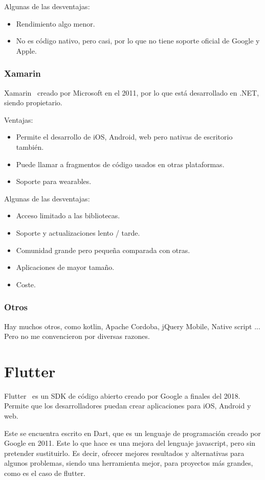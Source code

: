 Algunas de las desventajas:
\begin{itemize}
	\item Rendimiento algo menor.
	\item No es código nativo, pero casi, por lo que no tiene soporte oficial de Google y Apple.
\end{itemize}

\subsubsection{Xamarin}
Xamarin~\cite{wiki:xamarin} creado por Microsoft en el 2011, por lo que está desarrollado en .NET, siendo propietario.

Ventajas:
\begin{itemize}
	\item Permite el desarrollo de iOS, Android, web pero nativas de escritorio también.
	\item Puede llamar a fragmentos de código usados en otras plataformas.
	\item Soporte para wearables.
\end{itemize}

Algunas de las desventajas:
\begin{itemize}
	\item Acceso limitado a las bibliotecas.
	\item Soporte y actualizaciones lento / tarde.
	\item Comunidad grande pero pequeña comparada con otras.
	\item Aplicaciones de mayor tamaño.
	\item Coste.
\end{itemize}

\subsubsection{Otros}
Hay muchos otros, como kotlin, Apache Cordoba, jQuery Mobile, Native script ...
Pero no me convencieron por diversas razones.
 
\section{Flutter}
Flutter~\cite{wiki:flutter} es un SDK de código abierto creado por Google a finales del 2018. Permite que los desarrolladores puedan crear aplicaciones para iOS, Android y web.

Este se encuentra escrito en Dart, que es un lenguaje de programación creado por Google en 2011. Este lo que hace es una mejora del lenguaje javascript, pero sin pretender sustituirlo. Es decir, ofrecer mejores resultados y alternativas para algunos problemas, siendo una herramienta mejor, para proyectos más grandes, como es el caso de flutter.

